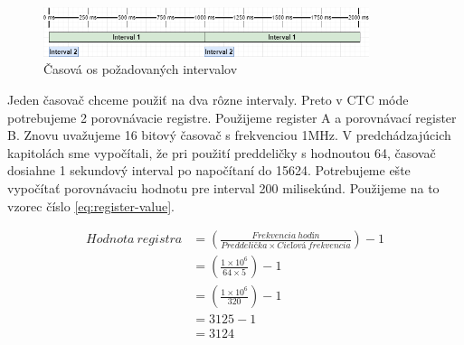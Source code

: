 \begin{figure}[!h]
    \centering
    \includegraphics[width=0.85\textwidth]{img/interval-timeline.drawio.png}
    \caption{Časová os požadovaných intervalov}
    \label{figure:interval-timeline}
\end{figure}

Jeden časovač chceme použiť na dva rôzne intervaly. Preto v CTC móde potrebujeme 2 porovnávacie registre. Použijeme register A a porovnávací register B. Znovu uvažujeme
16 bitový časovač s frekvenciou 1MHz. V predchádzajúcich kapitolách sme vypočítali, že pri použití preddeličky s hodnoutou 64, časovač dosiahne 1 sekundový interval
po napočítaní do 15624. Potrebujeme ešte vypočítať porovnávaciu hodnotu pre interval 200 milisekúnd. Použijeme na to vzorec číslo \ref{eq:register-value}.

\begin{equation}
    \begin{aligned}
        Hodnota\:registra & = (\frac{Frekvencia\:hodín}{Preddelička \times Cieľová\:frekvencia}) - 1 \\
                          & = (\frac{1 \times 10^{6}}{64 \times 5}) - 1                              \\
                          & = (\frac{1 \times 10^{6}}{320}) - 1                                      \\
                          & = 3125 - 1                                                               \\
                          & = 3124                                                                   \\
    \end{aligned}
\end{equation}

